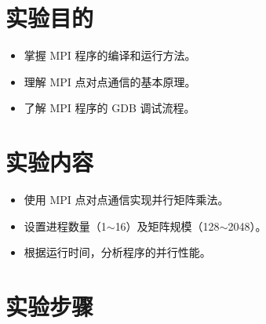\documentclass{SYSUReport}
\date{2025年3月26日}
\begin{document}
\cover
\thispagestyle{empty} %
\clearpage



\section{实验目的}
\begin{itemize}
   \item 掌握 MPI 程序的编译和运行方法。
    \item 理解 MPI 点对点通信的基本原理。
    \item 了解 MPI 程序的 GDB 调试流程。
\end{itemize}

\section{实验内容}
\begin{itemize}
   \item 使用 MPI 点对点通信实现并行矩阵乘法。
    \item 设置进程数量（1$\sim$16）及矩阵规模（128$\sim$2048）。
    \item 根据运行时间，分析程序的并行性能。
\end{itemize}

\section{实验步骤}
\end{document}
